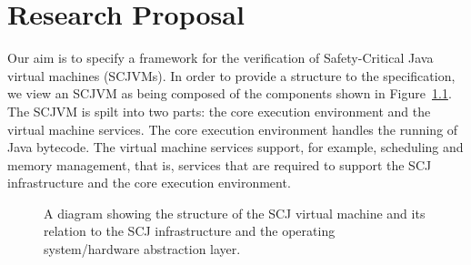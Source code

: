 \documentclass[a4paper,10pt]{report}
\begin{document}
\chapter{Research Proposal}
\label{research-proposal-chapter}




Our aim is to specify a framework for the verification of Safety-Critical Java
virtual machines (SCJVMs).  In order to provide a structure to the
specification, we view an SCJVM as being composed of the components shown in
Figure~\ref{scjvm-fig}.  The SCJVM is spilt into two parts: the core execution
environment and the virtual machine services. The core execution environment
handles the running of Java bytecode.  The virtual machine services support, for
example, scheduling and memory management, that is, services that are required
to support the SCJ infrastructure and the core execution environment.

\begin{figure}[ht]
  \centering
  \caption{A diagram showing the structure of the SCJ virtual machine and its
    relation to the SCJ infrastructure and the operating system/hardware
    abstraction layer.}
  \label{scjvm-fig}
\end{figure}
\end{document}
